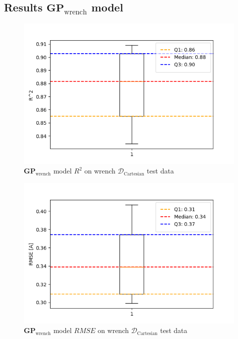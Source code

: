     \subsection{Results \(\boldsymbol{GP}_{\text{wrench}}\) model}
    \label{subsec:gp_wrench_results}

    \begin{figure}[H]
    \centering
    \includegraphics[width=1\columnwidth]{Images/05_results/wrench_boxplot_test_non_OC_R^2.png}
    \caption[\(\boldsymbol{GP}_{\text{wrench}}\) model \(R^2\) on wrench \(\mathcal{D}_{\text{Cartesian}}\) test data]{\(\boldsymbol{GP}_{\text{wrench}}\) model \(R^2\) on wrench \(\mathcal{D}_{\text{Cartesian}}\) test data}
    \label{fig:wrench_no_oc_R^2_test}
    \end{figure}

    \begin{figure}[H]
    \centering
    \includegraphics[width=1\columnwidth]{Images/05_results/wrench_boxplot_test_non_OC_RMSE.png}
    \caption[\(\boldsymbol{GP}_{\text{wrench}}\) model \(RMSE\) on wrench \(\mathcal{D}_{\text{Cartesian}}\) test data]{\(\boldsymbol{GP}_{\text{wrench}}\) model \(RMSE\) on wrench \(\mathcal{D}_{\text{Cartesian}}\) test data}
    \label{fig:wrench_no_oc_RMSE_test}
    \end{figure}


